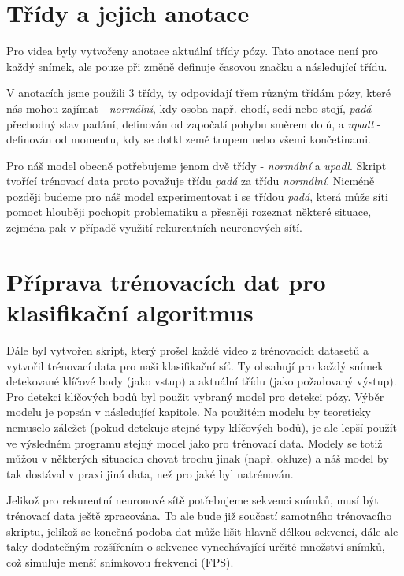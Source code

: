 \section{Třídy a jejich anotace}
Pro videa byly vytvořeny anotace aktuální třídy pózy. Tato anotace není pro
každý snímek, ale pouze při změně definuje časovou značku a následující třídu.

V anotacích jsme použili 3 třídy, ty odpovídají třem různým třídám pózy, které
nás mohou zajímat - \textit{normální}, kdy osoba např. chodí, sedí nebo stojí,
\textit{padá} - přechodný stav padání, definován od započatí pohybu směrem
dolů, a \textit{upadl} - definován od momentu, kdy se dotkl země trupem nebo
všemi končetinami.

Pro náš model obecně potřebujeme jenom dvě třídy - \textit{normální} a
\textit{upadl}. Skript tvořící trénovací data proto považuje třídu
\textit{padá} za třídu \textit{normální}. Nicméně později budeme pro náš model
experimentovat i se třídou \textit{padá}, která může síti pomoct hlouběji
pochopit problematiku a přesněji rozeznat některé situace, zejména pak v
případě využití rekurentních neuronových sítí.

\section{Příprava trénovacích dat pro klasifikační algoritmus}

Dále byl vytvořen skript, který prošel každé video z trénovacích datasetů a
vytvořil trénovací data pro naši klasifikační síť. Ty obsahují pro každý snímek
detekované klíčové body (jako vstup) a aktuální třídu (jako požadovaný výstup).
Pro detekci klíčových bodů byl použit vybraný model pro detekci pózy. Výběr
modelu je popsán v následující kapitole. Na použitém modelu by teoreticky
nemuselo záležet (pokud detekuje stejné typy klíčových bodů), je ale lepší
použít ve výsledném programu stejný model jako pro trénovací data. Modely se
totiž můžou v některých situacích chovat trochu jinak (např. okluze) a náš
model by tak dostával v praxi jiná data, než pro jaké byl natrénován.

Jelikož pro rekurentní neuronové sítě potřebujeme sekvenci snímků, musí být
trénovací data ještě zpracována. To ale bude již součastí samotného trénovacího
skriptu, jelikož se konečná podoba dat může lišit hlavně délkou sekvencí, dále
ale taky dodatečným rozšířením o sekvence vynechávající určité množství snímků,
což simuluje menší snímkovou frekvenci (FPS). 


\endinput